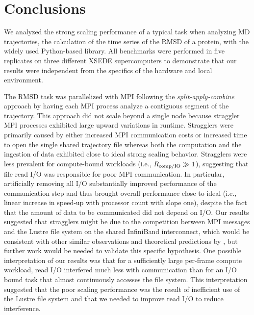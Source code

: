 
\section{Conclusions}
\label{sec:conclusions}

We analyzed the strong scaling performance of a typical task when analyzing MD trajectories, the calculation of the time series of the RMSD of a protein, with the widely used Python-based  library.
All benchmarks were performed in five replicates on three different XSEDE supercomputers to demonstrate that our results were independent from the specifics of the hardware and local environment.

The RMSD task was parallelized with MPI following the \emph{split-apply-combine} approach by having each MPI process analyze a contiguous segment of the trajectory.
This approach did not scale beyond a single node because straggler MPI processes exhibited large upward variations in runtime.
Stragglers were primarily caused by either increased MPI communication costs or increased time to open the single shared trajectory file whereas both the computation and the ingestion of data exhibited close to ideal strong scaling behavior.
Stragglers were less prevalent for compute-bound workloads (i.e., $R_{\text{comp/IO}} \gg 1$), suggesting that file read I/O was responsible for poor MPI communication.
In particular, artificially removing all I/O substantially improved performance of the communication step and thus brought overall performance close to ideal (i.e., linear increase in speed-up with processor count with slope one), despite the fact that the amount of data to be communicated did not depend on I/O.
Our results suggested that stragglers might be due to the competition between MPI messages and the Lustre file system on the shared InfiniBand interconnect, which would be consistent with other similar observations \cite{VMD2013} and theoretical predictions by \citet{Brown:2018ab}, but further work would be needed to validate this specific hypothesis.
One possible interpretation of our results was that for a sufficiently large per-frame compute workload, read I/O interfered much less with communication than for an I/O bound task that almost continuously accesses the file system.
This interpretation suggested that the poor scaling performance was the result of inefficient use of the Lustre file system and that we needed to improve read I/O to reduce interference.

